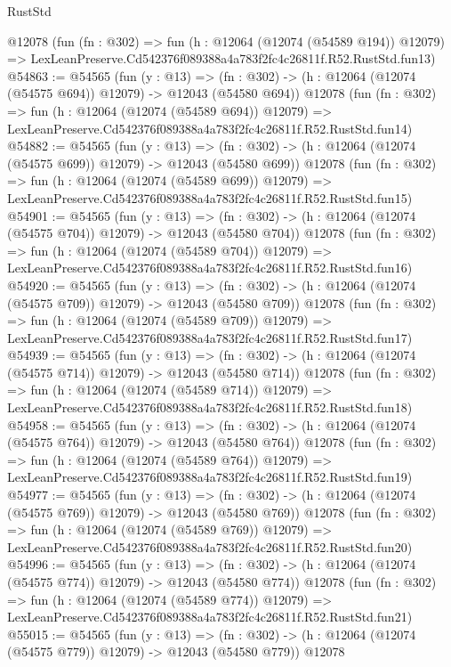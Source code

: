 \begin{lexlean}{RustStd}
\begin{coremodule}
    @12078
    (fun (fn : @302) =>
    fun (h : @12064 (@12074 (@54589 @194)) @12079) =>
    LexLeanPreserve.Cd542376f089388a4a783f2fc4c26811f.R52.RustStd.fun13)
@54863 := @54565
    (fun (y : @13) =>
    (fn : @302) -> (h : @12064 (@12074 (@54575 @694)) @12079) -> @12043 (@54580 @694))
    @12078
    (fun (fn : @302) =>
    fun (h : @12064 (@12074 (@54589 @694)) @12079) =>
    LexLeanPreserve.Cd542376f089388a4a783f2fc4c26811f.R52.RustStd.fun14)
@54882 := @54565
    (fun (y : @13) =>
    (fn : @302) -> (h : @12064 (@12074 (@54575 @699)) @12079) -> @12043 (@54580 @699))
    @12078
    (fun (fn : @302) =>
    fun (h : @12064 (@12074 (@54589 @699)) @12079) =>
    LexLeanPreserve.Cd542376f089388a4a783f2fc4c26811f.R52.RustStd.fun15)
@54901 := @54565
    (fun (y : @13) =>
    (fn : @302) -> (h : @12064 (@12074 (@54575 @704)) @12079) -> @12043 (@54580 @704))
    @12078
    (fun (fn : @302) =>
    fun (h : @12064 (@12074 (@54589 @704)) @12079) =>
    LexLeanPreserve.Cd542376f089388a4a783f2fc4c26811f.R52.RustStd.fun16)
@54920 := @54565
    (fun (y : @13) =>
    (fn : @302) -> (h : @12064 (@12074 (@54575 @709)) @12079) -> @12043 (@54580 @709))
    @12078
    (fun (fn : @302) =>
    fun (h : @12064 (@12074 (@54589 @709)) @12079) =>
    LexLeanPreserve.Cd542376f089388a4a783f2fc4c26811f.R52.RustStd.fun17)
@54939 := @54565
    (fun (y : @13) =>
    (fn : @302) -> (h : @12064 (@12074 (@54575 @714)) @12079) -> @12043 (@54580 @714))
    @12078
    (fun (fn : @302) =>
    fun (h : @12064 (@12074 (@54589 @714)) @12079) =>
    LexLeanPreserve.Cd542376f089388a4a783f2fc4c26811f.R52.RustStd.fun18)
@54958 := @54565
    (fun (y : @13) =>
    (fn : @302) -> (h : @12064 (@12074 (@54575 @764)) @12079) -> @12043 (@54580 @764))
    @12078
    (fun (fn : @302) =>
    fun (h : @12064 (@12074 (@54589 @764)) @12079) =>
    LexLeanPreserve.Cd542376f089388a4a783f2fc4c26811f.R52.RustStd.fun19)
@54977 := @54565
    (fun (y : @13) =>
    (fn : @302) -> (h : @12064 (@12074 (@54575 @769)) @12079) -> @12043 (@54580 @769))
    @12078
    (fun (fn : @302) =>
    fun (h : @12064 (@12074 (@54589 @769)) @12079) =>
    LexLeanPreserve.Cd542376f089388a4a783f2fc4c26811f.R52.RustStd.fun20)
@54996 := @54565
    (fun (y : @13) =>
    (fn : @302) -> (h : @12064 (@12074 (@54575 @774)) @12079) -> @12043 (@54580 @774))
    @12078
    (fun (fn : @302) =>
    fun (h : @12064 (@12074 (@54589 @774)) @12079) =>
    LexLeanPreserve.Cd542376f089388a4a783f2fc4c26811f.R52.RustStd.fun21)
@55015 := @54565
    (fun (y : @13) =>
    (fn : @302) -> (h : @12064 (@12074 (@54575 @779)) @12079) -> @12043 (@54580 @779))
    @12078

\end{coremodule}
\end{lexlean}
